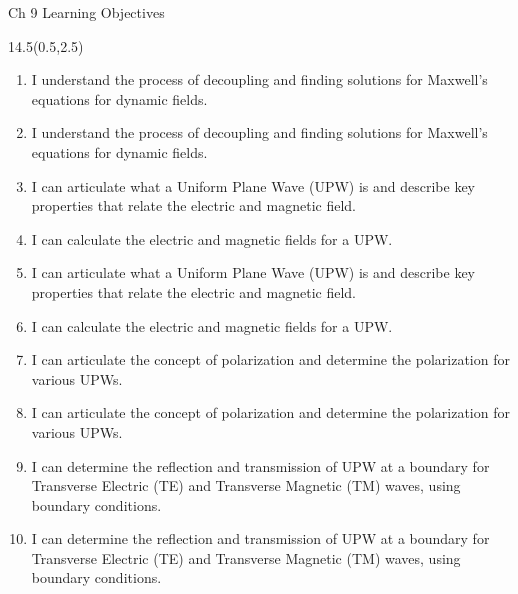 \def\obja{ I understand the process of decoupling and finding solutions for Maxwell's equations for dynamic fields.}
\def\objb{ I can articulate what a Uniform Plane Wave (UPW) is and describe key properties that relate the electric and magnetic field. }
\def\objc{ I can calculate the electric and magnetic fields for a UPW.}
\def\objd{ I can articulate the concept of polarization and determine the polarization for various UPWs.}
\def\obje{ I can determine the reflection and transmission of UPW at a boundary for Transverse Electric (TE) and Transverse Magnetic (TM) waves, using boundary conditions.}
\begin{frame}{Ch 9 Learning Objectives}
	\begin{textblock}{14.5}(0.5,2.5)
	\begin{myblock}[0.95]{}
	\begin{small}
	\begin{enumerate}[{9}.1]
		\ifnum{}
			\item \alert{ \obja }
		\else 
			\item \obja
		\fi 
		\ifnum{}
			\item \alert{ \objb }
			\item \alert{ \objc }
		\else 
			\item \objb
			\item \objc
		\fi 
		\ifnum{}
			\item \alert{ \objd }
		\else 
			\item \objd
		\fi 
		\ifnum{}
			\item \alert{ \obje }
		\else 
			\item \obje
		\fi 
	\end{enumerate}
	\end{small}
	\end{myblock}
	\end{textblock}
\end{frame}